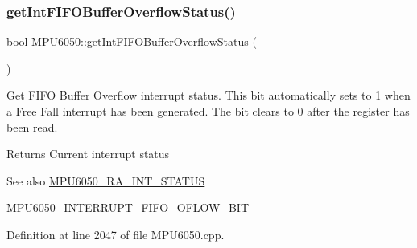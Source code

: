 \begin{DoxyCode}{0}

\end{DoxyCode}
\mbox{\label{classMPU6050_aa31427588f059c69d93ddb00ba257b12}} 
\subsubsection{\texorpdfstring{getIntFIFOBufferOverflowStatus()}{getIntFIFOBufferOverflowStatus()}}
{\footnotesize\ttfamily bool M\+P\+U6050\+::get\+Int\+F\+I\+F\+O\+Buffer\+Overflow\+Status (\begin{DoxyParamCaption}{ }\end{DoxyParamCaption})}

Get F\+I\+FO Buffer Overflow interrupt status. This bit automatically sets to 1 when a Free Fall interrupt has been generated. The bit clears to 0 after the register has been read. \begin{DoxyReturn}{Returns}
Current interrupt status 
\end{DoxyReturn}
\begin{DoxySeeAlso}{See also}
\mbox{\hyperlink{MPU6050_8h_a8337320c5ccc92def830e968d2e19d75}{M\+P\+U6050\+\_\+\+R\+A\+\_\+\+I\+N\+T\+\_\+\+S\+T\+A\+T\+US}} 

\mbox{\hyperlink{MPU6050_8h_a9d13e0ea2a96e5d234b7efa3de74d6bf}{M\+P\+U6050\+\_\+\+I\+N\+T\+E\+R\+R\+U\+P\+T\+\_\+\+F\+I\+F\+O\+\_\+\+O\+F\+L\+O\+W\+\_\+\+B\+IT}} 
\end{DoxySeeAlso}


Definition at line 2047 of file M\+P\+U6050.\+cpp.


